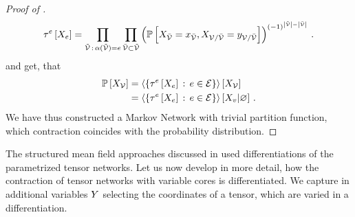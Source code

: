 \begin{proof}[Proof of ]
\begin{align*}
        \tau^{e}\left[X_{e}\right] = \prod_{\tilde{\mathcal{V}} \, : \, \alpha(\tilde{\mathcal{V}}) = e} \prod_{\bar{\mathcal{V}}\subset\tilde{\mathcal{V}}}
        \left(
        \mathbb{P}\left[X_{\bar{\mathcal{V}}}=x_{\bar{\mathcal{V}}},X_{\mathcal{V}/\bar{\mathcal{V}}}=y_{\mathcal{V}/\bar{\mathcal{V}}}\right]
        \right)^{(-1)^{\left|\tilde{\mathcal{V}}\right|-\left|\bar{\mathcal{V}}\right|}} \, .
    \end{align*}
    and get, that
    \begin{align*}
        \mathbb{P}\left[X_{\mathcal{V}}\right] & = \left\langle \left\{\tau^{e}\left[X_{e}\right]\, : \, e\in\mathcal{E}\right\}\right\rangle \left[ X_{\mathcal{V}} \right] \\
        & = \left\langle \left\{\tau^{e}\left[X_{e}\right]\, : \, e\in\mathcal{E}\right\}\right\rangle \left[ X_{v} | \varnothing \right] \, .
    \end{align*}
    We have thus constructed a Markov Network with trivial partition function, which contraction coincides with the probability distribution.
\end{proof}


The structured mean field approaches discussed in  used differentiations of the parametrized tensor networks.
Let us now develop in more detail, how the contraction of tensor networks with variable cores is differentiated.
We capture in additional variables $Y$ selecting the coordinates of a tensor, which are varied in a differentiation.


